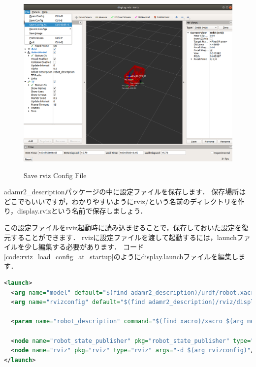 \documentclass[{../../master}]{subfiles}
\begin{document}
\begin{figure}[ht]
  \centering
  \includegraphics[height=40truemm]{images/rviz_save_config_as.png}
  \label{fig:rviz_save_config_as}
  \caption{Save \textsf{rviz} Config File}
\end{figure}

\noindent
\textsf{adamr2\_description}パッケージの中に設定ファイルを保存します．
保存場所はどこでもいいですが，わかりやすいように\textsf{rviz/}という名前のディレクトリを作り，\textsf{display.rviz}という名前で保存しましょう．

この設定ファイルを\textsf{rviz}起動時に読み込ませることで，保存しておいた設定を復元することができます．
\textsf{rviz}に設定ファイルを渡して起動するには，launchファイルを少し編集する必要があります．
コード\ref{code:rviz_load_config_at_startup}のように\textsf{display.launch}ファイルを編集します．

\begin{lstlisting}[language=XML, label=code:rviz_load_config_at_startup, caption=\textsf{rviz} Load Config File at Startup]
<launch>
  <arg name="model" default="$(find adamr2_description)/urdf/robot.xacro"/>
  <arg name="rvizconfig" default="$(find adamr2_description)/rviz/display.rviz"/>

  <param name="robot_description" command="$(find xacro)/xacro $(arg model)" />

  <node name="robot_state_publisher" pkg="robot_state_publisher" type="robot_state_publisher"/>
  <node name="rviz" pkg="rviz" type="rviz" args="-d $(arg rvizconfig)"/>
</launch>
\end{lstlisting}
\end{document}
